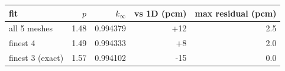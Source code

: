 \begin{tabular}{lrrrr}
\hline
fit & $p$ & $k_\infty$ & vs 1D (pcm) & max residual (pcm)\\
\hline
all 5 meshes & 1.48 & 0.994379 & +12 & 2.5\\
finest 4 & 1.49 & 0.994333 & +8 & 2.0\\
finest 3 (exact) & 1.57 & 0.994102 & -15 & 0.0\\
\hline
\end{tabular}

